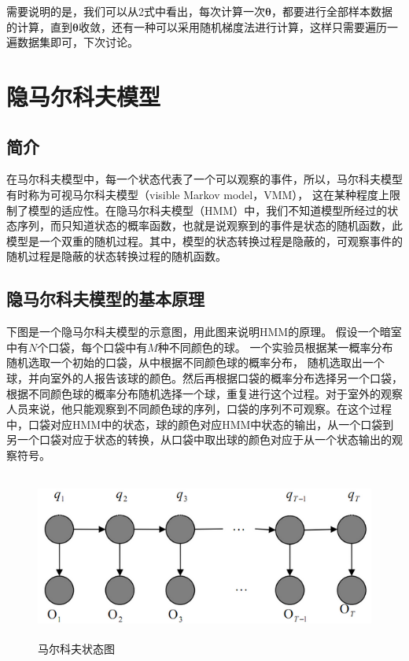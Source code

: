 \documentclass[a4paper,12pt]{book}
\begin{document}
    需要说明的是，我们可以从2式中看出，每次计算一次$\boldsymbol{\theta} $，都要进行全部样本数据的计算，直到$\boldsymbol{\theta} $收敛，还有一种可以采用随机梯度法进行计算，这样只需要遍历一遍数据集即可，下次讨论。

    \chapter{隐马尔科夫模型}

    \section{简介}
    在马尔科夫模型中，每一个状态代表了一个可以观察的事件，所以，马尔科夫模型有时称为可视马尔科夫模型（visible Markov model，VMM），
    这在某种程度上限制了模型的适应性。在隐马尔科夫模型（HMM）中，我们不知道模型所经过的状态序列，而只知道状态的概率函数，也就是说观察到的事件是状态的随机函数，此模型是一个双重的随机过程。其中，模型的状态转换过程是隐蔽的，可观察事件的随机过程是隐蔽的状态转换过程的随机函数。
    
    \section{隐马尔科夫模型的基本原理}
    下图是一个隐马尔科夫模型的示意图，用此图来说明HMM的原理。
    假设一个暗室中有$N$个口袋，每个口袋中有$M$种不同颜色的球。
    一个实验员根据某一概率分布随机选取一个初始的口袋，从中根据不同颜色球的概率分布，
    随机选取出一个球，并向室外的人报告该球的颜色。然后再根据口袋的概率分布选择另一个口袋，根据不同颜色球的概率分布随机选择一个球，重复进行这个过程。对于室外的观察人员来说，他只能观察到不同颜色球的序列，口袋的序列不可观察。在这个过程中，口袋对应HMM中的状态，球的颜色对应HMM中状态的输出，从一个口袋到另一个口袋对应于状态的转换，从口袋中取出球的颜色对应于从一个状态输出的观察符号。

    \begin{figure}[h]
        \begin{center}
            \includegraphics[width=13cm, height=5.5cm]{8_1.jpg}
            \caption{马尔科夫状态图}
        \end{center}
    \end{figure}
\end{document}
